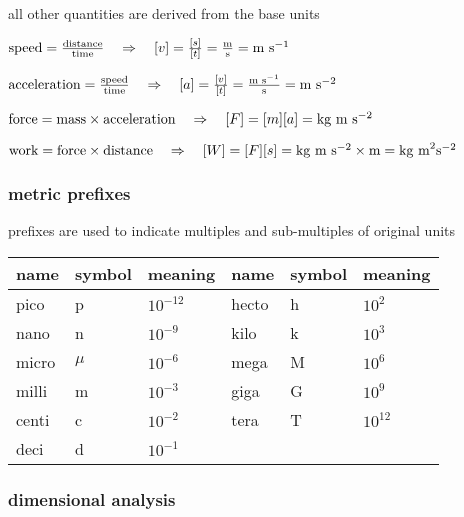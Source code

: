 all other quantities are derived from the base units


	$\text{speed} = \frac{\text{distance}}{\text{time}} \quad \Rightarrow \quad [v] = \frac{[s]}{[t]} = \frac{\text{m}}{\text{s}} = \text{m s}^{-1}$
	
	$\text{acceleration} = \frac{\text{speed}}{\text{time}} \quad \Rightarrow \quad [a] = \frac{[v]}{[t]} = \frac{\text{m s}^{-1}}{\text{s}} = \text{m s}^{-2}$ 

	$\text{force} = \text{mass} \times \text{acceleration} \quad \Rightarrow \quad [F] = [m][a] = \text{kg}\text{ m s$^{-2}$} $ 
	
	$\text{work} = \text{force} \times \text{distance} \quad \Rightarrow \quad [W] = [F][s] = \text{kg}\text{ m s$^{-2}$} \times \text{m} = \text{kg m}^2 \text{s}^{-2}$ \eoe



\subsubsection{metric prefixes}

prefixes are used to indicate multiples and sub-multiples of original units

\begin{center}
	\begin{tabular}{|C{1.8cm}|C{1.8cm}|C{1.8cm}||C{1.8cm}|C{1.8cm}|C{1.8cm}|}
		\hline name & symbol & meaning & name & symbol & meaning \\ 
		\hline pico & p & $10^{-12}$ & hecto & h & $10^{2}$\\ 
		\hline nano & n & $10^{-9}$ & kilo & k & $10^{3}$\\ 
		\hline micro & $\mu$ & $10^{-6}$ & mega & M & $10^{6}$\\ 
		\hline milli & m & $10^{-3}$ & giga & G & $10^{9}$\\ 
		\hline centi & c & $10^{-2}$ & tera & T & $10^{12}$\\ 
		\hline deci & d & $10^{-1}$ & & &\\ 
		\hline 
	\end{tabular} 
\end{center}

%
%	
%	
%	

\subsubsection{dimensional analysis}

